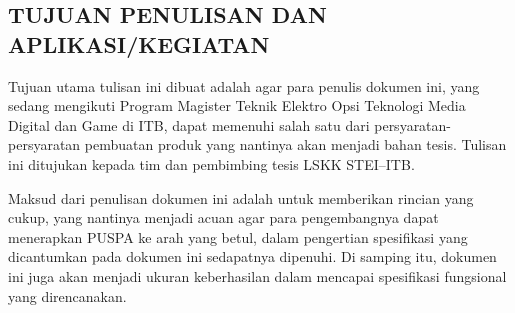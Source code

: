 \subsection*{\textcolor{subsectioncolor}{\textsf{TUJUAN PENULISAN DAN APLIKASI\slash KEGIATAN}}}

Tujuan utama tulisan ini dibuat adalah agar para penulis dokumen ini, yang sedang mengikuti Program Magister Teknik Elektro Opsi Teknologi Media Digital dan Game di ITB, dapat memenuhi salah satu dari persyaratan-persyaratan pembuatan produk yang nantinya akan menjadi bahan tesis.
Tulisan ini ditujukan kepada tim dan pembimbing tesis LSKK STEI--ITB.

Maksud dari penulisan dokumen ini adalah untuk memberikan rincian yang cukup, yang nantinya menjadi acuan agar para pengembangnya dapat menerapkan PUSPA ke arah yang betul, dalam pengertian spesifikasi yang dicantumkan pada dokumen ini sedapatnya dipenuhi.
Di samping itu, dokumen ini juga akan menjadi ukuran keberhasilan dalam mencapai spesifikasi fungsional yang direncanakan.
